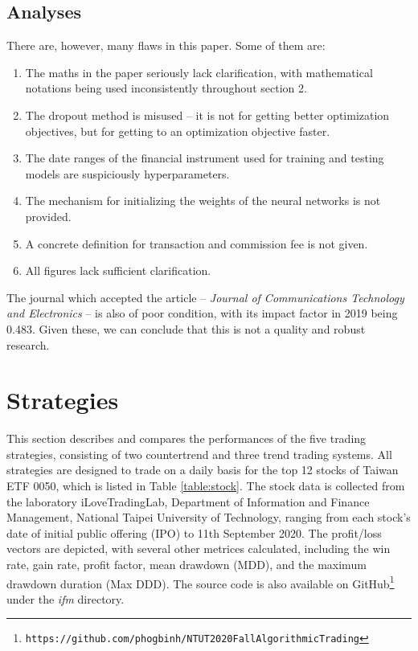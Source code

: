 \documentclass[12pt, letterpaper, oneside]{article}
\begin{document}
\subsection{Analyses}
There are, however, many flaws in this paper. Some of them are:
\begin{enumerate}
    \item The maths in the paper seriously lack clarification, with mathematical notations being used inconsistently throughout section 2.
    \item The dropout method is misused -- it is not for getting better optimization objectives, but for getting to an optimization objective faster.
    \item The date ranges of the financial instrument used for training and testing models are suspiciously hyperparameters.
    \item The mechanism for initializing the weights of the neural networks is not provided.
    \item A concrete definition for transaction and commission fee is not given.
    \item All figures lack sufficient clarification.
\end{enumerate}
The journal which accepted the article -- \textit{Journal of Communications Technology and Electronics} -- is also of poor condition, with its impact factor in 2019 being 0.483\cite{comtech}. Given these, we can conclude that this is not a quality and robust research.

\section{Strategies}
This section describes and compares the performances of the five trading strategies, consisting of two countertrend and three trend trading systems. All strategies are designed to trade on a daily basis for the top 12 stocks of Taiwan ETF 0050, which is listed in Table \ref{table:stock}. The stock data is collected from the laboratory iLoveTradingLab, Department of Information and Finance Management, National Taipei University of Technology, ranging from each stock's date of initial public offering (IPO) to 11th September 2020. The profit/loss vectors are depicted, with several other metrices calculated, including the win rate, gain rate, profit factor, mean drawdown (MDD), and the maximum drawdown duration (Max DDD). The source code is also available on GitHub\footnote{\texttt{https://github.com/phogbinh/NTUT2020FallAlgorithmicTrading}} under the \textit{ifm} directory.
\end{document}
